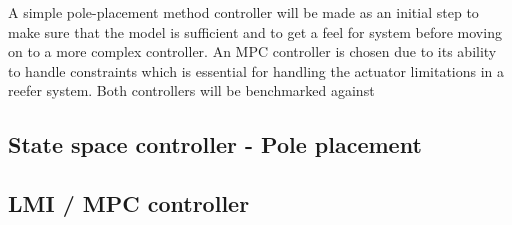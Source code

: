 A simple pole-placement method controller will be made as an initial step to make sure that the model is sufficient and to get a feel for system before moving on to a more complex controller. An MPC controller is chosen due to its ability to handle constraints which is essential for handling the actuator limitations in a reefer system. Both controllers will be benchmarked against


\subsection{State space controller - Pole placement}



\subsection{LMI / MPC controller}